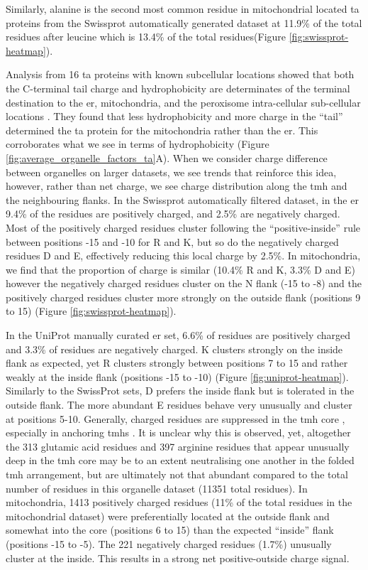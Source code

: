 Similarly, alanine is the second most common residue in mitochondrial located \gls{ta} proteins from the Swissprot automatically generated dataset at 11.9\% of the total residues after leucine which is 13.4\% of the total residues(Figure \ref{fig:swissprot-heatmap}).

Analysis from 16 \gls{ta} proteins with known subcellular locations showed that both the C-terminal tail charge and hydrophobicity are determinates of the terminal destination to the \gls{er}, mitochondria, and the peroxisome intra-cellular sub-cellular locations \cite{Costello2017}.
They found that less hydrophobicity and more charge in the ``tail'' determined the \gls{ta} protein for the mitochondria rather than the \gls{er}.
This corroborates what we see in terms of hydrophobicity (Figure \ref{fig:average_organelle_factors_ta}A).
When we consider charge difference between organelles on larger datasets, we see trends that reinforce this idea, however, rather than net charge, we see charge distribution along the \gls{tmh} and the neighbouring flanks.
In the Swissprot automatically filtered dataset, in the \gls{er} 9.4\% of the residues are positively charged, and 2.5\% are negatively charged.
Most of the positively charged residues cluster following the ``positive\--inside'' rule between positions -15 and -10 for R and K, but so do the negatively charged residues D and E, effectively reducing this local charge by 2.5\%.
In mitochondria, we find that the proportion of charge is similar (10.4\% R and K, 3.3\% D and E) however the negatively charged residues cluster on the N flank (-15 to -8) and the positively charged residues cluster more strongly on the outside flank (positions 9 to 15) (Figure \ref{fig:swissprot-heatmap}).

In the UniProt manually curated \gls{er} set, 6.6\% of residues are positively charged and 3.3\% of residues are negatively charged.
K clusters strongly on the inside flank as expected, yet R clusters strongly between positions 7 to 15 and rather weakly at the inside flank (positions -15 to -10) (Figure \ref{fig:uniprot-heatmap}).
Similarly to the SwissProt sets, D prefers the inside flank but is tolerated in the outside flank.
The more abundant E residues behave very unusually and cluster at positions 5-10.
Generally, charged residues are suppressed in the \gls{tmh} core \cite{Sharpe2010, Baeza-Delgado2013}, especially in anchoring \gls{tmh}s \cite{Baker2017}.
It is unclear why this is observed, yet, altogether the 313 glutamic acid residues and 397 arginine residues that appear unusually deep in the \gls{tmh} core may be to an extent neutralising one another in the folded \gls{tmh} arrangement, but are ultimately not that abundant compared to the total number of residues in this organelle dataset (11351 total residues).
In mitochondria, 1413 positively charged residues (11\% of the total residues in the mitochondrial dataset) were preferentially located at the outside flank and somewhat into the core (positions 6 to 15) than the expected ``inside'' flank (positions -15 to -5).
The 221 negatively charged residues (1.7\%) unusually cluster at the inside.
This results in a strong net positive\--outside charge signal.

